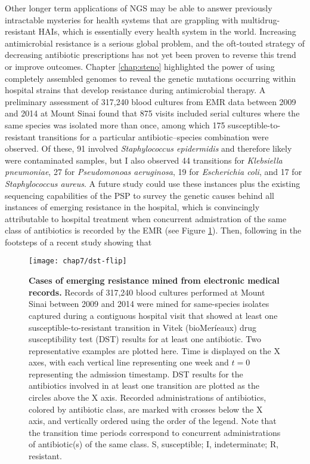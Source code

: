 Other longer term applications of NGS may be able to answer previously intractable mysteries for health systems that are grappling with multidrug-resistant HAIs, which is essentially every health system in the world. Increasing antimicrobial resistance is a serious global problem, and the oft-touted strategy of decreasing antibiotic prescriptions has not yet been proven to reverse this trend or improve outcomes.\autocite{Policy2010,Wagner2014} Chapter \ref{chap:steno} highlighted the power of using completely assembled genomes to reveal the genetic mutations occurring within hospital strains that develop resistance during antimicrobial therapy. A preliminary assessment of 317,240 blood cultures from EMR data between 2009 and 2014 at Mount Sinai found that 875 visits included serial cultures where the same species was isolated more than once, among which 175 susceptible-to-resistant transitions for a particular antibiotic–species combination were observed. Of these, 91 involved \emph{Staphylococcus epidermidis} and therefore likely were contaminated samples, but I also observed 44 transitions for \emph{Klebsiella pneumoniae}, 27 for \emph{Pseudomonoas aeruginosa}, 19 for \emph{Escherichia coli}, and 17 for \emph{Staphylococcus aureus}. A future study could use these instances plus the existing sequencing capabilities of the PSP to survey the genetic causes behind all instances of emerging resistance in the hospital, which is convincingly attributable to hospital treatment when concurrent admistration of the same class of antibiotics is recorded by the EMR (see Figure \ref{fig:dst_flip}). Then, following in the footsteps of a recent study showing that 
\begin{figure}[htb]
  \centering
  \texttt{[image: chap7/dst-flip]}
  \caption[Cases of emerging resistance mined from electronic medical records]{\textbf{Cases of emerging resistance mined from electronic medical records.} Records of 317,240 blood cultures performed at Mount Sinai between 2009 and 2014 were mined for same-species isolates captured during a contiguous hospital visit that showed at least one susceptible-to-resistant transition in Vitek (bioMeríeaux) drug susceptibility test (DST) results for at least one antibiotic. Two representative examples are plotted here. Time is displayed on the X axes, with each vertical line representing one week and $t=0$ representing the admission timestamp. DST results for the antibiotics involved in at least one transition are plotted as the circles above the X axis. Recorded administrations of antibiotics, colored by antibiotic class, are marked with crosses below the X axis, and vertically ordered using the order of the legend. Note that the transition time periods correspond to concurrent administrations of antibiotic(s) of the same class. S, susceptible; I, indeterminate; R, resistant.
  }
  \label{fig:dst_flip}
\end{figure}
